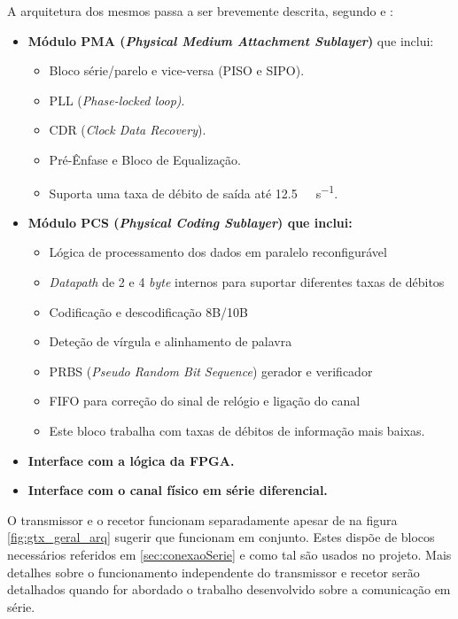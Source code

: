A arquitetura dos mesmos passa a ser brevemente descrita, segundo \cite{R010} e \cite{R011}:
\begin{itemize}
	\item \textbf{Módulo PMA (\textit{Physical Medium Attachment Sublayer})} que inclui:
	\begin{itemize}
		\item Bloco série/parelo e vice-versa (PISO e SIPO).
		\item PLL (\textit{Phase-locked loop)}.
		\item CDR (\textit{Clock Data Recovery}).
		\item Pré-Ênfase e Bloco de Equalização.
		\item Suporta uma taxa de débito de saída até \SI{12.5}{\giga\bit\per\second}.
		\end{itemize}
	\item \textbf{Módulo PCS (\textit{Physical Coding Sublayer}) que inclui:}
	\begin{itemize}
		\item Lógica de processamento dos dados em paralelo reconfigurável
		\item \textit{Datapath} de 2 e 4 \textit{byte} internos para suportar diferentes taxas de débitos
		\item Codificação e descodificação 8B/10B
		\item Deteção de vírgula e alinhamento de palavra
		\item PRBS (\textit{Pseudo Random Bit Sequence}) gerador e verificador
		\item FIFO para correção do sinal de relógio e ligação do canal
		\item Este bloco trabalha com taxas de débitos de informação mais baixas.
	\end{itemize}
	\item \textbf{Interface com a lógica da FPGA.}
	\item \textbf{Interface com o canal físico em série diferencial.}
\end{itemize}

O transmissor e o recetor funcionam separadamente apesar de na figura \ref{fig:gtx_geral_arq} sugerir que funcionam em conjunto. Estes dispõe de blocos necessários referidos em \ref{sec:conexaoSerie} e como tal são usados no projeto. Mais detalhes sobre o funcionamento independente do transmissor e recetor serão detalhados quando for abordado o trabalho desenvolvido sobre a comunicação em série.



